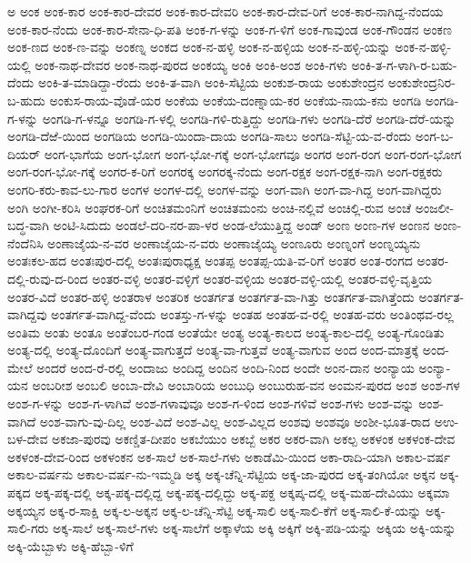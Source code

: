 ಅ
ಅಂಕ
ಅಂಕ-ಕಾರ
ಅಂಕ-ಕಾರ-ದೇವರ
ಅಂಕ-ಕಾರ-ದೇವರಿ
ಅಂಕ-ಕಾರ-ದೇವ-ರಿಗೆ
ಅಂಕ-ಕಾರ-ನಾಗಿದ್ದ-ನೆಂದಯ
ಅಂಕ-ಕಾರ-ನೆಂದು
ಅಂಕ-ಕಾರ-ಸೇನಾ-ಧಿ-ಪತಿ
ಅಂಕ-ಗ-ಳನ್ನು
ಅಂಕ-ಗ-ಳಿಗೆ
ಅಂಕ-ಗಾವುಂಡ
ಅಂಕ-ಗೌಂಡನ
ಅಂಕಣ
ಅಂಕ-ಣದ
ಅಂಕ-ಣ-ವನ್ನು
ಅಂಕಣ್ನ
ಅಂಕದ
ಅಂಕ-ನ-ಹಳ್ಳಿ
ಅಂಕ-ನ-ಹಳ್ಳಿಯ
ಅಂಕ-ನ-ಹಳ್ಳಿ-ಯನ್ನು
ಅಂಕ-ನ-ಹಳ್ಳಿ-ಯಲ್ಲಿ
ಅಂಕ-ನಾಥ-ದೇವರ
ಅಂಕ-ನಾಥ-ಪುರದ
ಅಂಕಯ್ಯ
ಅಂಕಿ
ಅಂಕಿ-ಅಂಶ
ಅಂಕಿ-ಗಳು
ಅಂಕಿ-ತ-ಗ-ಳಾಗಿ-ರ-ಬಹು-ದೆಂದು
ಅಂಕಿ-ತ-ಮಾಡಿದ್ದಾ-ರೆಂದು
ಅಂಕಿ-ತ-ವಾಗಿ
ಅಂಕಿ-ಸೆಟ್ಟಿಯ
ಅಂಕುಶ-ರಾಯ
ಅಂಕುಶೇಂದ್ರನ
ಅಂಕುಶೇಂದ್ರನಿರ-ಬ-ಹುದು
ಅಂಕುಸ-ರಾಯ-ವೊಡೆ-ಯರ
ಅಂಕೆಯ
ಅಂಕೆಯ-ದಂಣ್ನಾಯ-ಕರ
ಅಂಕೆಯ-ನಾಯ-ಕನು
ಅಂಗಡಿ
ಅಂಗಡಿ-ಗ-ಳನ್ನು
ಅಂಗಡಿ-ಗ-ಳನ್ನೂ
ಅಂಗಡಿ-ಗ-ಳಲ್ಲಿ
ಅಂಗಡಿ-ಗಳಿ-ರುತ್ತಿದ್ದು
ಅಂಗಡಿ-ಗಳು
ಅಂಗಡಿ-ದೆರೆ
ಅಂಗಡಿ-ದೆರೆ-ಯನ್ನು
ಅಂಗಡಿ-ದೆಱೆ-ಯಿಂದ
ಅಂಗಡಿಯ
ಅಂಗಡಿ-ಯಿಂದಾ-ದಾಯ
ಅಂಗಡಿ-ಸಾಲು
ಅಂಗಡಿ-ಸೆಟ್ಟಿ-ಯ-ವ-ರೆಂದು
ಅಂಗ-ಬ-ದಿಯರ್
ಅಂಗ-ಭಾಗೆಯ
ಅಂಗ-ಭೋಗ
ಅಂಗ-ಭೋ-ಗಕ್ಕೆ
ಅಂಗ-ಭೋಗವೂ
ಅಂಗರ
ಅಂಗ-ರಂಗ
ಅಂಗ-ರಂಗ-ಭೋಗ
ಅಂಗ-ರಂಗ-ಭೋ-ಗಕ್ಕೆ
ಅಂಗರ-ಕ-ರಿಗೆ
ಅಂಗರಕ್ಕ
ಅಂಗರಕ್ಕ-ನೆಂದು
ಅಂಗ-ರಕ್ಷಕ
ಅಂಗ-ರಕ್ಷಕ-ನಾಗಿ
ಅಂಗ-ರಕ್ಷಕರು
ಅಂಗರಿ-ಕರು-ಕಾವ-ಲು-ಗಾರ
ಅಂಗಳ
ಅಂಗಳ-ದಲ್ಲಿ
ಅಂಗಳ-ವನ್ನು
ಅಂಗ-ವಾಗಿ
ಅಂಗ-ವಾ-ಗಿದ್ದ
ಅಂಗ-ವಾಗಿದ್ದರು
ಅಂಗಿ
ಅಂಗೀ-ಕರಿಸಿ
ಅಂಘರಕ-ರಿಗೆ
ಅಂಚಿತಮಂನಿಗೆ
ಅಂಚಿತಮಂನು
ಅಂಚಿ-ನಲ್ಲಿವೆ
ಅಂಚಿಲ್ಲಿ-ರುವ
ಅಂಚೆ
ಅಂಜಲೀ-ಬದ್ಧ-ವಾಗಿ
ಅಂಟಿ-ಸಿದುದು
ಅಂಡಲೆ-ದರಿ-ನರ-ಪಾ-ಳರ
ಅಂಡ-ಲೆಯುತ್ತಿದ್ದ
ಅಂಡ್
ಅಂಣ
ಅಂಣ-ಗಳ
ಅಂಣನ
ಅಂಣ-ನೆಂದೆನಿಸಿ
ಅಂಣಾಜೈಯ-ನ-ವರ
ಅಂಣಾಜೈಯ-ನ-ವರು
ಅಂಣಾಜೈಯ್ಯ
ಅಂಣೂರು
ಅಂಣ್ನಂಗೆ
ಅಂಣ್ನಯ್ಯನು
ಅಂತಃಕಲ-ಹದ
ಅಂತಃಪುರ-ದಲ್ಲಿ
ಅಂತಃಪುರಾಧ್ಯಕ್ಷ
ಅಂತಪ್ಪ
ಅಂತಪ್ಪ-ಯತಿ-ವ-ರಿಗೆ
ಅಂತರ
ಅಂತ-ರಂಗದ
ಅಂತರ-ದಲ್ಲಿ-ರುವು-ದ-ರಿಂದ
ಅಂತರ-ವಳ್ಳಿ
ಅಂತರ-ವಳ್ಳಿಗೆ
ಅಂತರ-ವಳ್ಳಿಯ
ಅಂತರ-ವಳ್ಳಿ-ಯಲ್ಲಿ
ಅಂತರ-ವಳ್ಳಿ-ವೃತ್ತಿಯ
ಅಂತರ-ವಿದೆ
ಅಂತರ-ಹಳ್ಳಿ
ಅಂತರಾಳ
ಅಂತರಿಕ
ಅಂತರ್ಗತ
ಅಂತರ್ಗತ-ವಾ-ಗಿತ್ತು
ಅಂತರ್ಗತ-ವಾಗಿತ್ತೆಂದು
ಅಂತರ್ಗತ-ವಾಗಿದ್ದವು
ಅಂತರ್ಗತ-ವಾಗಿದ್ದ-ವೆಂದು
ಅಂತಸ್ತು-ಗ-ಳನ್ನು
ಅಂತಹ
ಅಂತಹ-ವ-ರಲ್ಲಿ
ಅಂತಹ-ವರು
ಅಂತಿಂಥವ-ರಲ್ಲ
ಅಂತಿಮ
ಅಂತು
ಅಂತೂ
ಅಂತೆಂಬರ-ಗಂಡ
ಅಂತೆಯೇ
ಅಂತ್ಯ
ಅಂತ್ಯ-ಕಾಲದ
ಅಂತ್ಯ-ಕಾಲ-ದಲ್ಲಿ
ಅಂತ್ಯ-ಗೊಂಡಿತು
ಅಂತ್ಯ-ದಲ್ಲಿ
ಅಂತ್ಯ-ದೊಂದಿಗೆ
ಅಂತ್ಯ-ವಾಗುತ್ತದೆ
ಅಂತ್ಯ-ವಾ-ಗುತ್ತವೆ
ಅಂತ್ಯ-ವಾಗುವ
ಅಂದ
ಅಂದ-ಮಾತ್ರಕ್ಕೆ
ಅಂದ-ಮೇಲೆ
ಅಂದರೆ
ಅಂದ-ರೆ-ರಲ್ಲಿ
ಅಂದಾಜು
ಅಂದಿದ್ದ
ಅಂದಿನ
ಅಂದಿ-ನಿಂದ
ಅಂದೇ
ಅಂನ-ದಾನ
ಅಂನ್ಯಾಯ
ಅಂನ್ಯಾ-ಯನ
ಅಂಬರೀಶ
ಅಂಬಲಿ
ಅಂಬಾ-ದೇವಿ
ಅಂಬಾರಿಯ
ಅಂಬುಧಿ
ಅಂಬುರುಹ-ವನ
ಅಂಮನ-ಪುರದ
ಅಂಶ
ಅಂಶ-ಗಳ
ಅಂಶ-ಗ-ಳನ್ನು
ಅಂಶ-ಗ-ಳಾಗಿವೆ
ಅಂಶ-ಗಳಾವುವೂ
ಅಂಶ-ಗ-ಳಿಂದ
ಅಂಶ-ಗಳಿವೆ
ಅಂಶ-ಗಳು
ಅಂಶ-ವನ್ನು
ಅಂಶ-ವಾಗಿದೆ
ಅಂಶ-ವಾಗು-ವು-ದಿಲ್ಲ
ಅಂಶ-ವಿದೆ
ಅಂಶ-ವಿಲ್ಲ
ಅಂಶ-ವಿಲ್ಲದ
ಅಂಶವು
ಅಂಶವೂ
ಅಂಶೀ-ಭೂತ-ರಾದ
ಅಉ-ಬಳ-ದೇವ
ಅಕಜಾ-ಪುರವು
ಅಕಣ್ಡಿತ-ದೀಪಂ
ಅಕಬೆಯುಂ
ಅಕಬ್ಬೆ
ಅಕರ
ಅಕರ-ವಾಗಿ
ಅಕಲ್ಪ
ಅಕಳಂಕ
ಅಕಳಂಕ-ದೇವ
ಅಕಳಂಕ-ದೇವ-ರಿಂದ
ಅಕಳಂಕನ
ಅಕ-ಸಾಲೆ
ಅಕ-ಸಾಲೆ-ಗಳು
ಅಕಾಡೆಮಿ-ಯಿಂದ
ಅಕಾ-ರಾದಿ-ಯಾಗಿ
ಅಕಾಲ-ವರ್ಷ
ಅಕಾಲ-ವರ್ಷನು
ಅಕಾಲ-ವರ್ಷ-ನು-ಇಮ್ಮಡಿ
ಅಕ್ಕ
ಅಕ್ಕ-ಚೆನ್ನಿ-ಸೆಟ್ಟಿಯ
ಅಕ್ಕ-ಜಾ-ಪುರದ
ಅಕ್ಕ-ತಂಗಿಯೋ
ಅಕ್ಕನ
ಅಕ್ಕ-ಪಕ್ಕದ
ಅಕ್ಕ-ಪಕ್ಕ-ದಲ್ಲಿ
ಅಕ್ಕ-ಪಕ್ಕ-ದಲ್ಲಿದ್ದ
ಅಕ್ಕ-ಪಕ್ಕ-ದಲ್ಲಿದ್ದು
ಅಕ್ಕ-ಪಕ್ದ
ಅಕ್ಕಪ್ಕ-ದಲ್ಲಿ
ಅಕ್ಕ-ಮಹ-ದೇವಿಯು
ಅಕ್ಕಮಾ
ಅಕ್ಕಯ್ಯನ
ಅಕ್ಕ-ರ-ಸಾಕ್ಷಿ
ಅಕ್ಕ-ಲ-ಅಕ್ಕನ
ಅಕ್ಕ-ಲ-ಚೆನ್ನಿ-ಸೆಟ್ಟಿ
ಅಕ್ಕ-ಸಾಲಿ
ಅಕ್ಕ-ಸಾಲಿ-ಕೆಗೆ
ಅಕ್ಕ-ಸಾಲಿ-ಕೆ-ಯನ್ನು
ಅಕ್ಕ-ಸಾಲಿ-ಗರು
ಅಕ್ಕ-ಸಾಲೆ
ಅಕ್ಕ-ಸಾಲೆ-ಗಳು
ಅಕ್ಕ-ಸಾಲೆಗೆ
ಅಕ್ಕಾಳೆಯ
ಅಕ್ಕಿ
ಅಕ್ಕಿಗೆ
ಅಕ್ಕಿ-ಪಡಿ-ಯನ್ನು
ಅಕ್ಕಿಯ
ಅಕ್ಕಿ-ಯನ್ನು
ಅಕ್ಕಿ-ಯೆಬ್ಬಾಳು
ಅಕ್ಕಿ-ಹೆಬ್ಬಾ-ಳಿಗೆ
